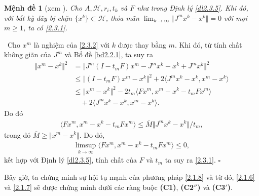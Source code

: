 \documentclass[14pt, oneside,A4paper]{book}
\theoremstyle{plain}
\newcommand{\eproof}{\hfill $\square$}
\newcommand{\chm}{{\bf  Chứng minh.}}
\newtheorem{md}[theorem]{Mệnh đề}
\begin{document}
\begin{md}[xem \cite{BHN}] \label{md2.3.6}
Cho $A,\mathcal H,r_{i},t_{k}$ và $F$ như trong Định lý \ref{dl2.3.5}. Khi đó, với bất kỳ dãy bị chặn $\lbrace x^{k} \rbrace \subset \mathcal H$, thỏa mãn $\lim_{k \rightarrow \infty} \Vert J^{m}x^{k}-x^{k} \Vert = 0$ với mọi $m\geq 1$, ta có \eqref{2.3.1}.
\end{md}
\noindent \chm \rm \ 
Cho $x^{m}$ là nghiệm của \eqref{2.3.2} với $k$ được thay bằng $m$. Khi đó, từ tính chất không giãn của $J^{m}$ và Bổ đề \ref{bd2.2.1}, ta suy ra
\begin{align*}
\Vert x^{m}-x^{k} \Vert^{2} &= \Vert J^{m}(I-t_{m}F)x^{m}-J^{m}x^{k}-x^{k}+J^{m}x^{k} \Vert^{2} \\
&\leq \Vert (I-t_{m}F)x^{m}-x^{k} \Vert^{2} +2\langle J^{m}x^{k}-x^{k},x^{m}-x^{k} \rangle \\
&\leq \Vert x^{m}-x^{k} \Vert^{2}- 2t_{m}\langle Fx^{m},x^{m}-x^{k}-t_{m}Fx^{m} \rangle \\
&\quad + 2\langle J^{m}x^{k}-x^{k},x^{m}-x^{k} \rangle.
\end{align*}
Do đó 
\begin{align*}
\langle Fx^{m},x^{m}-x^{k}-t_{m}Fx^{m} \rangle \leq \overline{M} \Vert J^{m}x^{k}-x^{k} \Vert /t_{m},
\end{align*}
trong đó $\overline{M} \geq \Vert x^{m}-x^{k} \Vert$. Do đó, 
\begin{align*}
\limsup_{k \rightarrow \infty}\langle Fx^{m},x^{m}-x^{k}-t_{m}Fx^{m} \rangle \leq 0,
\end{align*}
kết hợp với Định lý \ref{dl2.3.5}, tính chất của $F$ và $t_{m}$ ta suy ra \eqref{2.3.1}.
\eproof 

Bây giờ, ta chứng minh sự hội tụ mạnh của phương pháp \eqref{2.1.8} và từ đó, \eqref{2.1.6} và \eqref{2.1.7} sẽ được chứng minh dưới các ràng buộc {\bf (C1)}, {\bf ({C2}$''$)} và {\bf ({C3}$'$)}.
\end{document}
